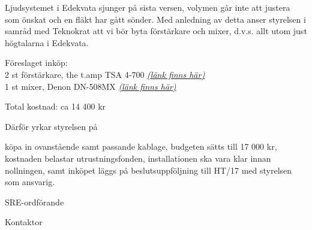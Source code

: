 \documentclass[../_main/handlingar.tex]{subfiles}
\begin{document}
Ljudsystemet i Edekvata sjunger på sista versen, volymen går inte att justera som önskat och en fläkt har gått sönder. Med anledning av detta anser styrelsen i samråd med Teknokrat att vi bör byta förstärkare och mixer, d.v.s. allt utom just högtalarna i Edekvata.

Föreslaget inköp:\\
2 st förstärkare, the t.amp TSA 4-700 \href{https://www.thomann.de/se/the_tamp_tsa_4700.htm}{\textit{(länk finns här)}}\\
1 st mixer, Denon DN-508MX \href{https://www.thomann.de/se/denon_dn_508mx.htm}{\textit{(länk finns här)}}

Total kostnad: ca 14 400 kr

Därför yrkar styrelsen på

\begin{attsatser}
    \att köpa in ovanstående samt passande kablage,
    \att budgeten sätts till 17 000 kr,
    \att kostnaden belastar utrustningsfonden,
    \att installationen ska vara klar innan nollningen, samt
    \att inköpet läggs på beslutsuppföljning till HT/17 med styrelsen som ansvarig.
\end{attsatser}

\begin{signatures}{2}
    \ist
    \signature{\sreordf}{SRE-ordförande}
    \signature{Johan Karlberg}{Kontaktor}
\end{signatures}
\end{document}
